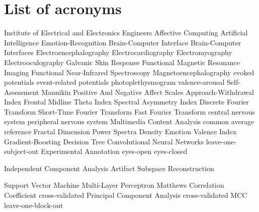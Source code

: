 \chapter{List of acronyms}

\begin{acronym}[TDMAAA]
					{Institute of Electrical and Electronics Engineers}
					{Affective Computing}	
					{Artificial Intelligence}
    			   {Emotion-Recognition}
    			   {Brain-Computer Interface}
    			   {Brain-Computer Interfaces}
    			   {Electroencephalography}
    				{Electrocardiography}
    		{Electromyography}
    	 	{Electrooculography}
    		{Galvanic Skin Response}
               {Functional Magnetic Resonance Imaging}
              {Functional Near-Infrared Spectroscopy}
               {Magnetoencephalography}
               {evoked potentials}
    		  {event-related potentials}
            {photoplethysmogram}
            {valence-arousal}
    		{Self-Assessment Mannikin}
    		{Positive And Negative Affect Scales}
    		{Approach-Withdrawal Index}
    		{Frontal Midline Theta Index}
    		{Spectral Asymmetry Index}
    		{Discrete Fourier Transform}
       {Short-Time Fourier Transform}
    		{Fast Fourier Transform}
    		{central nervous system}
    		{peripheral nervous system}
    		{Multimedia Content Analysis}	
    		{common average reference}
    		{Fractal Dimension}
    		{Power Spectra Density}
    		{Emotion Valence Index}
    		{Gradient-Boosting Decision Tree}
    		{Convolutional Neural Networks}
    		{leave-one-subject-out}
    		{Experimental Annotation}
    		{eyes-open}
    		{eyes-closed}
    
    
    
    		{Independent Component Analysis}
    		{Artifact Subspace Reconstruction}
    
    		{Support Vector Machine}
    		{Multi-Layer Perceptron}
    		{Matthews Correlation Coefficient}
			{cross-validated}
    		{Principal Component Analysis}
    		{cross-validated MCC}
    		{leave-one-block-out}
\end{acronym}


